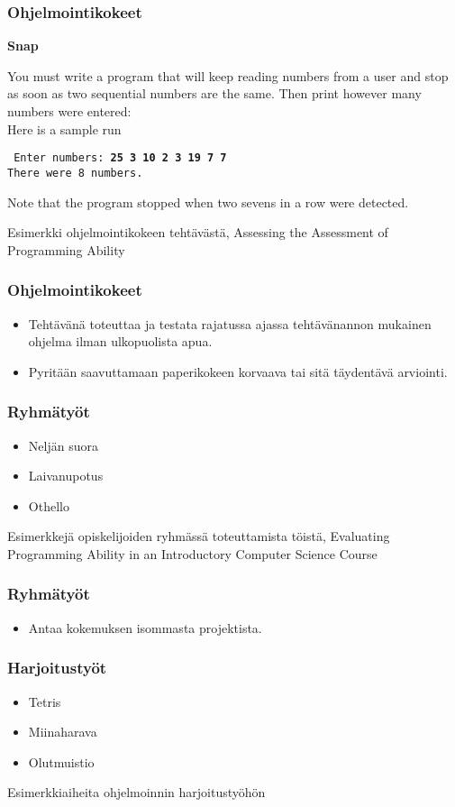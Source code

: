 \documentclass[finnish]{beamer}
\begin{document}
\frame
{
  \frametitle{Ohjelmointikokeet}
  {\large\bf Snap}

  You must write a program that will keep reading numbers from a user and stop as soon as two sequential numbers are the same. Then print however many numbers were entered:\\
  Here is a sample run

  \vspace{1mm}
  {\tt \textcolor[rgb]{0.3,0.3,0.3}{ Enter numbers: }{\bf 25 3 10 2 3 19 7 7}\\
  \textcolor[rgb]{0.3,0.3,0.3}{There were 8 numbers.}}

  \vspace{1mm}
  Note that the program stopped when two sevens in a row were detected.
  \vspace{5mm}

  \textcolor[rgb]{0.5,0.5,0.5}{\scriptsize Esimerkki ohjelmointikokeen tehtävästä, Assessing the Assessment of Programming Ability}
}

\frame
{
  \frametitle{Ohjelmointikokeet}
  \begin{itemize}
    \item Tehtävänä toteuttaa ja testata rajatussa ajassa tehtävänannon mukainen ohjelma ilman ulkopuolista apua.
    \item Pyritään saavuttamaan paperikokeen korvaava tai sitä täydentävä arviointi.
  \end{itemize}
}

\frame
{
  \frametitle{Ryhmätyöt}
  \begin{itemize}
    \item Neljän suora
    \item Laivanupotus
    \item Othello
  \end{itemize}
  \vspace{5mm}

  \textcolor[rgb]{0.5,0.5,0.5}{\scriptsize Esimerkkejä opiskelijoiden ryhmässä toteuttamista töistä, Evaluating Programming Ability in an Introductory Computer Science Course}
}

\frame
{
  \frametitle{Ryhmätyöt}
  \begin{itemize}
    \item Antaa kokemuksen isommasta projektista.
  \end{itemize}
}

\frame
{
  \frametitle{Harjoitustyöt}
  \begin{itemize}
    \item Tetris
    \item Miinaharava
    \item Olutmuistio
  \end{itemize}
  \vspace{5mm}

  \textcolor[rgb]{0.5,0.5,0.5}{\scriptsize Esimerkkiaiheita ohjelmoinnin harjoitustyöhön}
}
\end{document}
